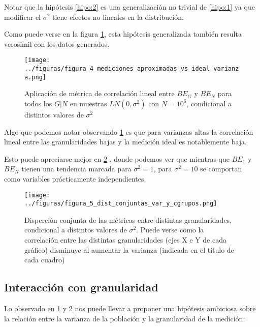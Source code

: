 Notar que la hipótesis \ref{hipo:2} es una generalización no trivial de \ref{hipo:1} ya que modificar el $\sigma^2$ tiene efectos no lineales en la distribución.

Como puede verse en la figura \ref{fig:4}, esta hipótesis generalizada también resulta verosímil con los datos generados.

\begin{figure}[H]
    \centering 
    \texttt{[image: ../figuras/figura\_4\_mediciones\_aproximadas\_vs\_ideal\_varianza.png]} 
    \caption{Aplicación de métrica de correlación lineal entre $BE_G$ y $BE_N$ para todos los $G | N$ en muestras $LN(0,\sigma^2)$ con $N=10^6$, condicional a distintos valores de $\sigma^2$}
    \label{fig:4}
\end{figure}

Algo que podemos notar observando \ref{fig:4} es que para varianzas altas la correlación lineal entre las granularidades bajas y la medición ideal es notablemente baja.

Esto puede apreciarse mejor en \ref{fig:5} , donde podemos ver que mientras que $BE_1$ y $BE_N$ tienen una tendencia marcada para $\sigma^2=1$, para $\sigma^2=10$ se comportan como variables prácticamente independientes.

\begin{figure}[H]
    \centering 
    \texttt{[image: ../figuras/figura\_5\_dist\_conjuntas\_var\_y\_cgrupos.png]} 
    \caption{Disperción conjunta de las métricas entre distintas granularidades, condicional a distintos valores de $\sigma^2$. Puede verse como la correlación entre las distintas granularidades (ejes X e Y de cada gráfico) disminuye al aumentar la varianza (indicada en el título de cada cuadro)}
    \label{fig:5}
\end{figure}



\subsection{Interacción con granularidad}

Lo observado en \ref{fig:4} y \ref{fig:5} nos puede llevar a proponer una hipótesis ambiciosa sobre la relación entre la varianza de la población y la granularidad de la medición:

